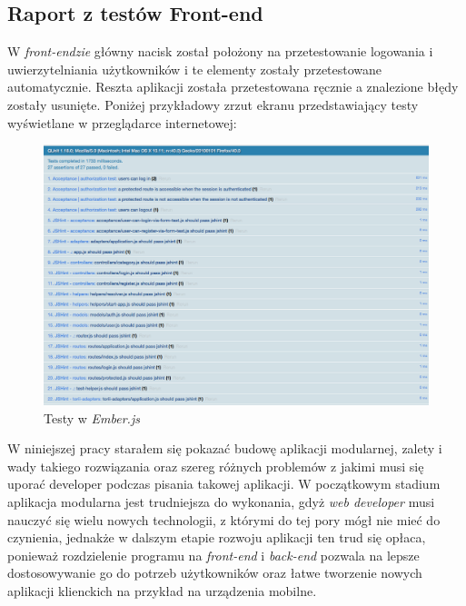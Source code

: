 \documentclass[openright]{xmgr}
\begin{document}
\subsection{Raport z testów Front-end}
W \textit{front-endzie} główny nacisk został położony na przetestowanie logowania i uwierzytelniania użytkowników i te elementy zostały przetestowane automatycznie. Reszta aplikacji została przetestowana ręcznie a znalezione błędy zostały usunięte. Poniżej przykładowy zrzut ekranu przedstawiający testy wyświetlane w przeglądarce internetowej:
\begin{figure}[H]
\centering
\includegraphics[width=1\hsize]{images/ember-testy.png}
\caption{Testy w \textit{Ember.js}\label{RYS.1}}
\end{figure}
\summary
W niniejszej pracy starałem się pokazać budowę aplikacji modularnej, zalety i wady takiego rozwiązania oraz szereg różnych problemów z jakimi musi się uporać developer podczas pisania takowej aplikacji. W początkowym stadium aplikacja modularna jest trudniejsza do wykonania, gdyż \textit{web developer} musi nauczyć się wielu nowych technologii, z którymi do tej pory mógł nie mieć do czynienia, jednakże w dalszym etapie rozwoju aplikacji ten trud się opłaca, ponieważ rozdzielenie programu na \textit{front-end} i \textit{back-end} pozwala na lepsze dostosowywanie go do potrzeb użytkowników oraz łatwe tworzenie nowych aplikacji klienckich na przykład na urządzenia mobilne.
\end{document}
